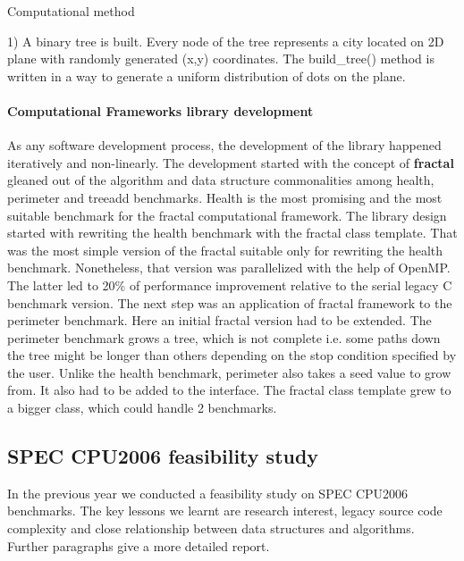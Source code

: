 \documentclass[10pt,a4paper]{report}
\begin{document}
Computational method

1) A binary tree is built. Every node of the tree represents a city located on 2D plane with randomly generated (x,y) coordinates. The build\_tree() method is written in a way to generate a uniform distribution of dots on the plane.


\paragraph{Computational Frameworks library development}
\quad As any software development process, the development of the library happened iteratively and non-linearly. The development started with the concept of \textbf{fractal} gleaned out of the algorithm and data structure commonalities among health, perimeter and treeadd benchmarks. Health is the most promising and the most suitable benchmark for the fractal computational framework. The library design started with rewriting the health benchmark with the fractal class template. That was the most simple version of the fractal suitable only for rewriting the health benchmark. Nonetheless, that version was parallelized with the help of OpenMP. The latter led to 20\% of performance improvement relative to the serial legacy C benchmark version.\newline\null
\quad The next step was an application of fractal framework to the perimeter benchmark. Here an initial fractal version had to be extended. The perimeter benchmark grows a tree, which is not complete i.e. some paths down the tree might be longer than others depending on the stop condition specified by the user. Unlike the health benchmark, perimeter also takes a seed value to grow from. It also had to be added to the interface. The fractal class template grew to a bigger class, which could handle 2 benchmarks.    


\subsection{SPEC CPU2006 feasibility study}
\label{spec_cpu2006_feasibility}
\quad In the previous year we conducted a feasibility study on SPEC CPU2006 benchmarks. The key lessons we learnt are research interest, legacy source code complexity and close relationship between data structures and algorithms. Further paragraphs give a more detailed report.
\end{document}
